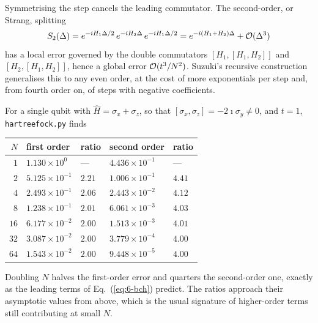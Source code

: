 Symmetrising the step cancels the leading commutator.  The second-order, or
Strang, splitting
\begin{equation}
  S_2(\Delta) = e^{-i H_1\Delta/2}\,e^{-i H_2\Delta}\,
                e^{-i H_1\Delta/2}
  = e^{-i(H_1+H_2)\Delta} + \mathcal{O}(\Delta^3)
  \label{eq:6-strang}
\end{equation}
has a local error governed by the double commutators $[H_1,[H_1,H_2]]$ and
$[H_2,[H_1,H_2]]$, hence a global error $\mathcal{O}(t^3/N^2)$.  Suzuki's recursive
construction generalises this to any even order, at the cost of more
exponentials per step and, from fourth order on, of steps with negative
coefficients.

For a single qubit with $\hat{H}=\sigma_x+\sigma_z$, so that
$[\sigma_x,\sigma_z]=-2\imath\sigma_y\ne0$, and $t=1$,
\texttt{hartreefock.py} finds
\begin{center}
\renewcommand{\arraystretch}{1.2}
\begin{tabular}{rllll}
\toprule
$N$ & first order & ratio & second order & ratio\\
\midrule
$1$  & $1.130\times10^{0}$  & --- & $4.436\times10^{-1}$ & ---\\
$2$  & $5.125\times10^{-1}$ & $2.21$ & $1.006\times10^{-1}$ & $4.41$\\
$4$  & $2.493\times10^{-1}$ & $2.06$ & $2.443\times10^{-2}$ & $4.12$\\
$8$  & $1.238\times10^{-1}$ & $2.01$ & $6.061\times10^{-3}$ & $4.03$\\
$16$ & $6.177\times10^{-2}$ & $2.00$ & $1.513\times10^{-3}$ & $4.01$\\
$32$ & $3.087\times10^{-2}$ & $2.00$ & $3.779\times10^{-4}$ & $4.00$\\
$64$ & $1.543\times10^{-2}$ & $2.00$ & $9.448\times10^{-5}$ & $4.00$\\
\bottomrule
\end{tabular}
\end{center}
Doubling $N$ halves the first-order error and quarters the second-order one,
exactly as the leading terms of Eq.~(\ref{eq:6-bch}) predict.  The ratios
approach their asymptotic values from above, which is the usual signature of
higher-order terms still contributing at small $N$.

